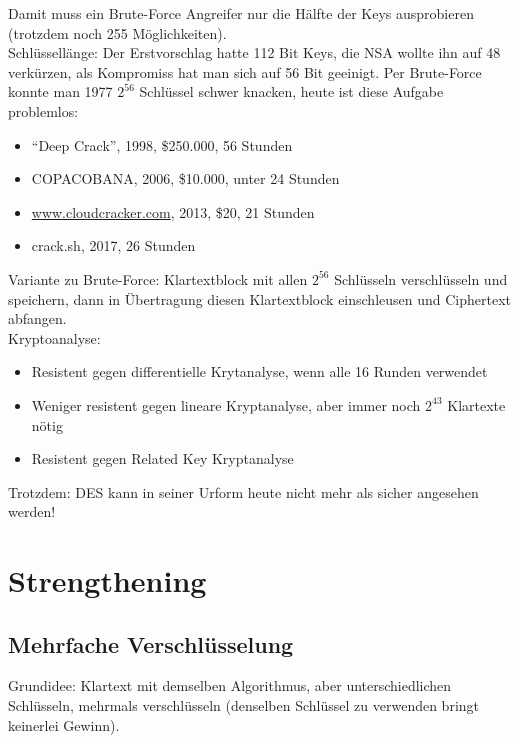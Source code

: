 Damit muss ein Brute-Force Angreifer nur die Hälfte der Keys ausprobieren (trotzdem noch 255 Möglichkeiten).\\


Schlüssellänge: Der Erstvorschlag hatte 112 Bit Keys, die NSA wollte ihn auf 48 verkürzen, als Kompromiss hat man sich auf 56 Bit geeinigt.
Per Brute-Force konnte man 1977 $2^{56}$ Schlüssel schwer knacken, heute ist diese Aufgabe problemlos:

\begin{itemize}
    \item ``Deep Crack'', 1998, \$250.000, 56 Stunden
    \item COPACOBANA, 2006, \$10.000, unter 24 Stunden
    \item \url{www.cloudcracker.com}, 2013, \$20, 21 Stunden
    \item crack.sh, 2017, 26 Stunden
\end{itemize}

Variante zu Brute-Force: Klartextblock mit allen $2^{56}$ Schlüsseln verschlüsseln und speichern, dann in Übertragung diesen
Klartextblock einschleusen und Ciphertext abfangen. \\

Kryptoanalyse: 

\begin{itemize}
    \item Resistent gegen differentielle Krytanalyse, wenn alle 16 Runden verwendet
    \item Weniger resistent gegen lineare Kryptanalyse, aber immer noch $2^{43}$ Klartexte nötig
    \item Resistent gegen Related Key Kryptanalyse
\end{itemize}

Trotzdem: DES kann in seiner Urform heute nicht mehr als sicher angesehen werden!


\section{Strengthening}

\subsection{Mehrfache Verschlüsselung}

Grundidee: Klartext mit demselben Algorithmus, aber unterschiedlichen Schlüsseln, mehrmals verschlüsseln (denselben Schlüssel zu verwenden bringt keinerlei Gewinn).

